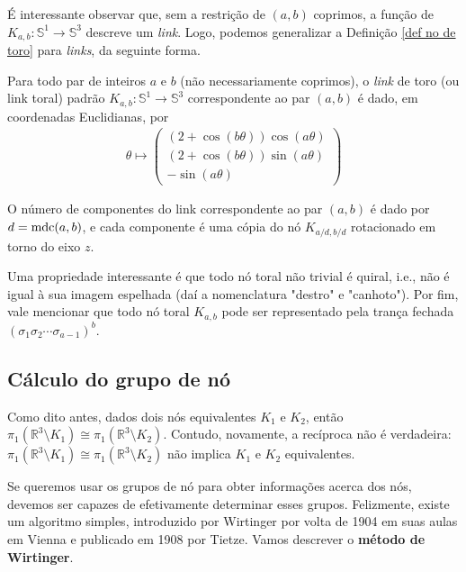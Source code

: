 	\par\vspace{0.3cm} É interessante observar que, sem a restrição de $(a,b)$ coprimos, a função de $K_{a,b}:\mathbb{S}^1\to\mathbb{S}^3$ descreve um \textit{link}. Logo, podemos generalizar a Definição \eqref{def no de toro} para \textit{links}, da seguinte forma.
	\begin{deff}
		\label{def link de toro}
		Para todo par de inteiros $a$ e $b$ (não necessariamente coprimos), o \textit{link} de toro (ou link toral) padrão $K_{a,b}: \mathbb{S}^1\to\mathbb{S}^3$ correspondente ao par $(a,b)$ é dado, em coordenadas Euclidianas, por 
		\begin{align*}
		\theta\mapsto
		\left( 
		\begin{matrix}
		(2+\cos(b\theta))\cos(a\theta) \\
		(2+\cos(b\theta))\sin(a\theta) \\
		-\sin(a\theta)
		\end{matrix} 
		\right)
		\end{align*}
		\par\vspace{0.3cm} O número de componentes do link correspondente ao par $(a,b)$ é dado por $d = \operatorname{mdc}(a,b)$, e cada componente é uma cópia do nó $\displaystyle{K_{a/d, b/d}}$ rotacionado em torno do eixo $z$.
	\end{deff}
	\par\vspace{0.3cm} Uma propriedade interessante é que todo nó toral não trivial é quiral, i.e., não é igual à sua imagem espelhada (daí a nomenclatura "destro" e "canhoto"). Por fim, vale mencionar que todo nó toral $K_{a,b}$ pode ser representado pela trança fechada $(\sigma_1\sigma_2\cdots\sigma_{a-1})^b$.  
	
	\subsection{Cálculo do grupo de nó}
	\hspace{12pt} Como dito antes, dados dois nós equivalentes $K_1$ e $K_2$, então $\pi_1(\mathbb{R}^3\setminus K_1) \cong \pi_1(\mathbb{R}^3\setminus K_2)$. Contudo, novamente, a recíproca não é verdadeira: $\pi_1(\mathbb{R}^3\setminus K_1) \cong \pi_1(\mathbb{R}^3\setminus K_2)$ não implica $K_1$ e $K_2$ equivalentes. 
	\par\vspace{0.3cm} Se queremos usar os grupos de nó para obter informações acerca dos nós, devemos ser capazes de efetivamente determinar esses grupos. Felizmente, existe um algoritmo simples, introduzido por Wirtinger por volta de 1904 em suas aulas em Vienna e publicado em 1908 por Tietze. Vamos descrever o \textbf{método de Wirtinger}.
